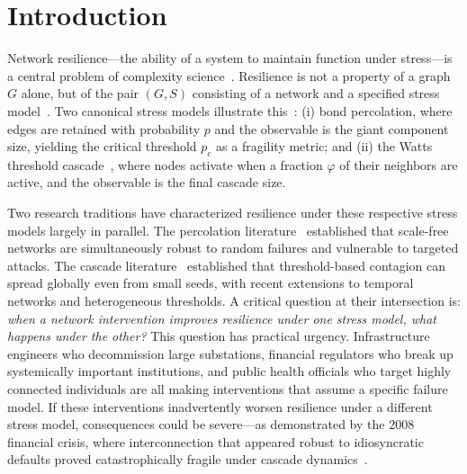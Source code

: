 \documentclass[aps,pre,twocolumn,superscriptaddress,showpacs]{revtex4-2}
\newcommand{\pc}{p_c}
\begin{document}

\maketitle

\section{Introduction}
\label{sec:intro}

Network resilience---the ability of a system to maintain function under stress---is a central problem of complexity science~\cite{Boccaletti2006,Gao2016,Barabasi2016,Artime2024,Valdez2020}. Resilience is not a property of a graph $G$ alone, but of the pair $(G, S)$ consisting of a network and a specified stress model~\cite{Alderson2010}. Two canonical stress models illustrate this~\cite{Stauffer2014,Newman2010}: (i) bond percolation, where edges are retained with probability $p$ and the observable is the giant component size, yielding the critical threshold $\pc$ as a fragility metric; and (ii) the Watts threshold cascade~\cite{Watts2002}, where nodes activate when a fraction $\varphi$ of their neighbors are active, and the observable is the final cascade size.

Two research traditions have characterized resilience under these respective stress models largely in parallel. The percolation literature~\cite{Barabasi1999,Albert2000,Cohen2001,Geng2021} established that scale-free networks are simultaneously robust to random failures and vulnerable to targeted attacks. The cascade literature~\cite{Watts2002,Gleeson2007,Dodds2004,Nishioka2022,Karimi2021} established that threshold-based contagion can spread globally even from small seeds, with recent extensions to temporal networks and heterogeneous thresholds. A critical question at their intersection is: \emph{when a network intervention improves resilience under one stress model, what happens under the other?} This question has practical urgency. Infrastructure engineers who decommission large substations, financial regulators who break up systemically important institutions, and public health officials who target highly connected individuals are all making interventions that assume a specific failure model. If these interventions inadvertently worsen resilience under a different stress model, consequences could be severe---as demonstrated by the 2008 financial crisis, where interconnection that appeared robust to idiosyncratic defaults proved catastrophically fragile under cascade dynamics~\cite{Battiston2012}.
\end{document}
